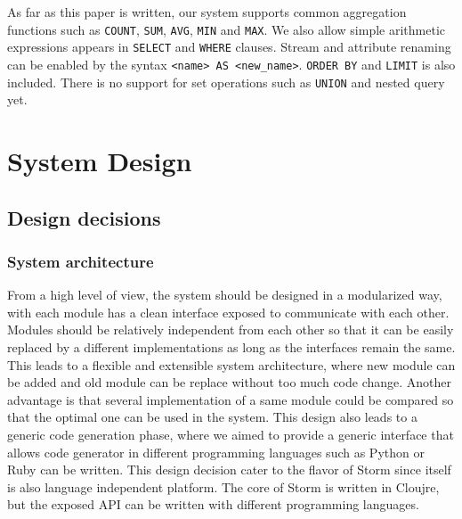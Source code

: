 \documentclass[conference, twocolumn, twoside, 11pt]{IEEEtran}
\theoremstyle{definition}
\begin{document}
As far as this paper is written, our system supports common aggregation functions such as \texttt{COUNT}, \texttt{SUM}, \texttt{AVG}, \texttt{MIN} and \texttt{MAX}. We also allow simple arithmetic expressions appears in \texttt{SELECT} and \texttt{WHERE} clauses. Stream and attribute renaming can be enabled by the syntax \texttt{<name> AS <new\_name>}. \texttt{ORDER BY} and \texttt{LIMIT} is also included. There is no support for set operations such as \texttt{UNION} and nested query yet.

\section{System Design}\label{sys-design}
\subsection{Design decisions}
\subsubsection{System architecture}
From a high level of view, the system should be designed in a modularized way, with each module has a clean interface exposed to communicate with each other. Modules should be relatively independent from each other so that it can be easily replaced by a different implementations as long as the interfaces remain the same. This leads to a flexible and extensible system architecture, where new module can be added and old module can be replace without too much code change. Another advantage is that several implementation of a same module could be compared so that the optimal one can be used in the system. This design also leads to a generic code generation phase, where we aimed to provide a generic interface that allows code generator in different programming languages such as Python or Ruby can be written. This design decision cater to the flavor of Storm since itself is also language independent platform. The core of Storm is written in Cloujre, but the exposed API can be written with different programming languages.
\end{document}
